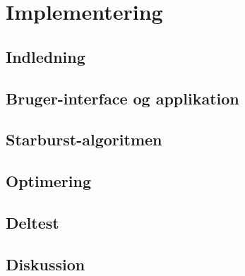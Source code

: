 \documentclass[rapport.tex]{subfiles}
\begin{document}
\section{Implementering}
	\subsection{Indledning}
	\subsection{Bruger-interface og applikation}
	\subsection{Starburst-algoritmen}
	\subsection{Optimering}
	\subsection{Deltest}
	\subsection{Diskussion}
		
\end{document}
